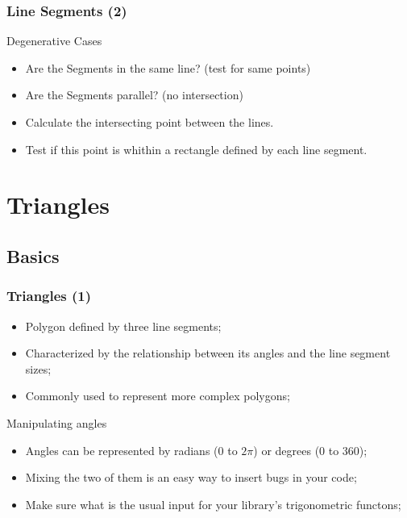 \documentclass{beamer}
\begin{document}
\begin{frame}
  \frametitle{Line Segments (2)}

  \begin{block}{Degenerative Cases}
    \begin{itemize}
    \item Are the Segments in the same line? (test for same points)
    \item Are the Segments parallel? (no intersection)
    \end{itemize}
  \end{block}

  \begin{itemize}
  \item Calculate the intersecting point between the lines.
  \item Test if this point is whithin a rectangle defined by each line
    segment.
  \end{itemize}
\end{frame}



\section{Triangles}

\subsection{Basics}
\begin{frame}
  \frametitle{Triangles (1)}
  \begin{block}{}
    \begin{itemize}
    \item Polygon defined by three line segments;
    \item Characterized by the relationship between its angles and the
      line segment sizes;
    \item Commonly used to represent more complex polygons;
    \end{itemize}
  \end{block}

  \begin{block}{Manipulating angles}
    \begin{itemize}
    \item Angles can be represented by radians (0 to $2\pi$) or
      degrees (0 to 360);
    \item Mixing the two of them is an easy way to insert bugs in your code;
    \item Make sure what is the usual input for your library's
      trigonometric functons;
      
    \end{itemize}
  \end{block}
\end{frame}
\end{document}
